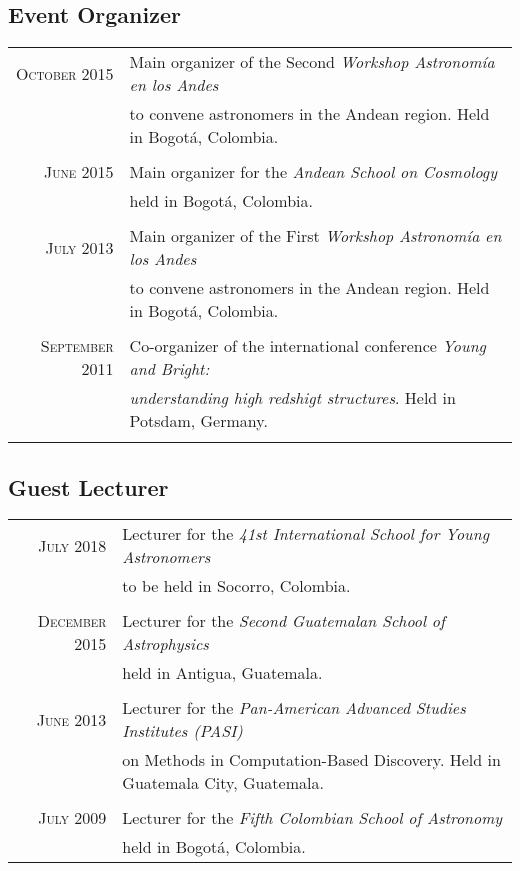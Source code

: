 \documentclass[a4paper,10pt]{article} %
\begin{document}
\subsection{Event Organizer}
\begin{tabular}{rl}
 \textsc{October 2015} &  Main organizer of the Second
 \textit{Workshop Astronom\'ia en los Andes} \\
   & to convene astronomers in the Andean region.  Held in Bogot\'a, Colombia.\\
& \\
 \textsc{June 2015} &  Main organizer for the 
 \textit{Andean School on Cosmology} \\
   & held in Bogot\'a, Colombia.\\
& \\
 \textsc{July 2013} &  Main organizer of the First
 \textit{Workshop Astronom\'ia en los Andes} \\
   & to convene astronomers in the Andean region.  Held in Bogot\'a, Colombia.\\
& \\
 \textsc{September 2011} &  Co-organizer of the international
 conference \textit{Young and Bright:}\\
 & \textit{understanding high redshigt structures}. Held in
 Potsdam, Germany.\\ 
& \\

\end{tabular}


\subsection{Guest Lecturer}
\begin{tabular}{rl}
 \textsc{July 2018} &  Lecturer for the
 \textit{41st International School for Young Astronomers} \\
   & to be held in Socorro, Colombia.\\
& \\
 \textsc{December 2015} &  Lecturer for the 
 \textit{Second Guatemalan School of Astrophysics} \\
   & held in Antigua, Guatemala.\\
& \\
 \textsc{June 2013} &  Lecturer for the 
 \textit{Pan-American Advanced Studies Institutes (PASI)} \\
   &  on Methods in Computation-Based Discovery.  Held in Guatemala City, Guatemala.\\
& \\
\textsc{July 2009} & Lecturer for the 
\textit{Fifth Colombian School of Astronomy}\\
& held in Bogot\'a, Colombia.\\

\end{tabular}
\end{document}
